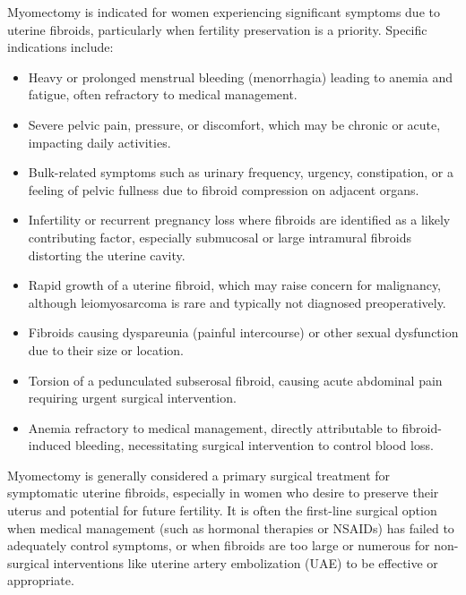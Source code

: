 Myomectomy is indicated for women experiencing significant symptoms due to uterine fibroids, particularly when fertility preservation is a priority. Specific indications include:

\begin{itemize}
  \item Heavy or prolonged menstrual bleeding (menorrhagia) leading to anemia and fatigue, often refractory to medical management.
  \item Severe pelvic pain, pressure, or discomfort, which may be chronic or acute, impacting daily activities.
  \item Bulk-related symptoms such as urinary frequency, urgency, constipation, or a feeling of pelvic fullness due to fibroid compression on adjacent organs.
  \item Infertility or recurrent pregnancy loss where fibroids are identified as a likely contributing factor, especially submucosal or large intramural fibroids distorting the uterine cavity.
  \item Rapid growth of a uterine fibroid, which may raise concern for malignancy, although leiomyosarcoma is rare and typically not diagnosed preoperatively.
  \item Fibroids causing dyspareunia (painful intercourse) or other sexual dysfunction due to their size or location.
  \item Torsion of a pedunculated subserosal fibroid, causing acute abdominal pain requiring urgent surgical intervention.
  \item Anemia refractory to medical management, directly attributable to fibroid-induced bleeding, necessitating surgical intervention to control blood loss.
\end{itemize}

Myomectomy is generally considered a primary surgical treatment for symptomatic uterine fibroids, especially in women who desire to preserve their uterus and potential for future fertility. It is often the first-line surgical option when medical management (such as hormonal therapies or NSAIDs) has failed to adequately control symptoms, or when fibroids are too large or numerous for non-surgical interventions like uterine artery embolization (UAE) to be effective or appropriate. 


